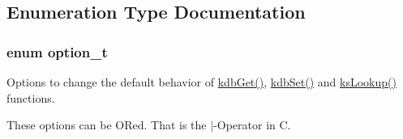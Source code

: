\subsection{Enumeration Type Documentation}
\hypertarget{group__kdb_ga98a3d6a4016c9dad9cbd1a99a9c2a45a}{
\subsubsection[{option\-\_\-t}]{\setlength{\rightskip}{0pt plus 5cm}enum {\bf option\-\_\-t}}}\label{group__kdb_ga98a3d6a4016c9dad9cbd1a99a9c2a45a}
Options to change the default behavior of \hyperlink{group__kdb_ga28e385fd9cb7ccfe0b2f1ed2f62453a1}{kdb\-Get()}, \hyperlink{group__kdb_ga11436b058408f83d303ca5e996832bcf}{kdb\-Set()} and \hyperlink{group__keyset_gaa34fc43a081e6b01e4120daa6c112004}{ks\-Lookup()} functions.

These options can be O\-Red. That is the $|$-\/\-Operator in C.

